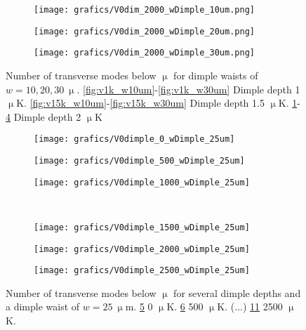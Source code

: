 \documentclass[11pt]{article}
\begin{document}
\begin{figure}
	\begin{subfigure}[b]{0.3\textwidth}
		\texttt{[image: grafics/V0dim\_2000\_wDimple\_10um.png]}
		\caption{}
		\label{fig:v2k_w10um}
	\end{subfigure}
	\begin{subfigure}[b]{0.3\textwidth}
		\texttt{[image: grafics/V0dim\_2000\_wDimple\_20um.png]}
		\caption{}
		\label{fig:v2k_w20um}
	\end{subfigure}
	\begin{subfigure}[b]{0.3\textwidth}
		\texttt{[image: grafics/V0dim\_2000\_wDimple\_30um.png]}
		\caption{}
		\label{fig:v2k_w30um}
	\end{subfigure}
	\caption{Number of transverse modes below $\upmu$ for dimple waists of $w=10, 20, 30\ \upmu$. \ref{fig:v1k_w10um}-\ref{fig:v1k_w30um} Dimple depth 1 $\upmu$K. \ref{fig:v15k_w10um}-\ref{fig:v15k_w30um} Dimple depth 1.5 $\upmu$K. \ref{fig:v2k_w10um}-\ref{fig:v2k_w30um} Dimple depth 2 $\upmu$K}
\end{figure}

\begin{figure}
	\centering
	\begin{subfigure}[b]{0.3\textwidth}
		\texttt{[image: grafics/V0dimple\_0\_wDimple\_25um]}
		\caption{}
		\label{fig:v0_w25um}
	\end{subfigure}
	\begin{subfigure}[b]{0.3\textwidth}
		\texttt{[image: grafics/V0dimple\_500\_wDimple\_25um]}
		\caption{}
		\label{fig:v500_w25um}
	\end{subfigure}
	\begin{subfigure}[b]{0.3\textwidth}
		\texttt{[image: grafics/V0dimple\_1000\_wDimple\_25um]}
		\caption{}
		\label{fig:v1000_w25um}
	\end{subfigure}\\
	
	\begin{subfigure}[b]{0.3\textwidth}
		\texttt{[image: grafics/V0dimple\_1500\_wDimple\_25um]}
		\caption{}
		\label{fig:v1500_w25um}
	\end{subfigure}
	\begin{subfigure}[b]{0.3\textwidth}
		\texttt{[image: grafics/V0dimple\_2000\_wDimple\_25um]}
		\caption{}
		\label{fig:v2000_w25um}
	\end{subfigure}
	\begin{subfigure}[b]{0.3\textwidth}
		\texttt{[image: grafics/V0dimple\_2500\_wDimple\_25um]}
		\caption{}
		\label{fig:v2500_w25um}
	\end{subfigure}
	\caption{Number of transverse modes below $\upmu$ for several dimple depths and a dimple waist of $w=25\ \upmu$m. \ref{fig:v0_w25um} 0 $\upmu$K. \ref{fig:v500_w25um} 500 $\upmu$K. (...)  \ref{fig:v2500_w25um} 2500 $\upmu$K.}
\end{figure}
\end{document}
